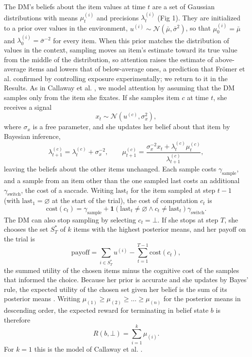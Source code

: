 \documentclass[10pt,letterpaper]{article}
\begin{document}
The DM's beliefs about the item values at time \(t\) are a set of
Gaussian distributions with means \(\mu_t^{(i)}\) and precisions
\(\lambda_t^{(i)}\) (Fig 1). They are initialized to a prior over values
in the environment,
\(u^{(i)} \sim \mathcal{N}(\bar{\mu}, \bar{\sigma}^2)\), so that
\(\mu_0^{(i)} = \bar{\mu}\) and \(\lambda_0^{(i)} = \bar{\sigma}^{-2}\)
for every item. When this prior matches the distribution of values in
the context, sampling moves an item's estimate toward its true value
from the middle of the distribution, so attention raises the estimate of
above-average items and lowers that of below-average ones, a prediction
that Frömer et al. \cite{fromer2025} confirmed by controlling exposure
experimentally; we return to it in the Results. As in Callaway et al.
\cite{callaway2021}, we model attention by assuming that the DM samples
only from the item she fixates. If she samples item \(c\) at time \(t\),
she receives a signal \begin{equation}
x_t \sim \mathcal{N}\!\left(u^{(c)}, \sigma_x^2\right), 
\end{equation} where \(\sigma_x\) is a free parameter, and she updates
her belief about that item by Bayesian inference, \begin{equation}
\lambda_{t+1}^{(c)} = \lambda_t^{(c)} + \sigma_x^{-2}, \qquad \mu_{t+1}^{(c)} = \frac{\sigma_x^{-2} x_t + \lambda_t^{(c)} \mu_t^{(c)}}{\lambda_{t+1}^{(c)}}, 
\end{equation} leaving the beliefs about the other items unchanged. Each
sample costs \(\gamma_{\text{sample}}\), and a sample from an item other
than the one sampled last costs an additional
\(\gamma_{\text{switch}}\), the cost of a saccade. Writing
\(\text{last}_t\) for the item sampled at step \(t - 1\) (with
\(\text{last}_1 = \varnothing\) at the start of the trial), the cost of
computation \(c_t\) is \begin{equation}
\text{cost}(c_t) = \gamma_{\text{sample}} + \mathbf{1}\!\left(\text{last}_t \neq \varnothing \wedge c_t \neq \text{last}_t\right) \gamma_{\text{switch}}. 
\end{equation} The DM can also stop sampling by selecting
\(c_t = \bot\). If she stops at step \(T\), she chooses the set
\(S^*_T\) of \(k\) items with the highest posterior means, and her
payoff on the trial is \begin{equation}
\text{payoff} = \sum_{i \in S^*_T} u^{(i)} - \sum_{t=1}^{T-1} \text{cost}(c_t), 
\end{equation} the summed utility of the chosen items minus the
cognitive cost of the samples that informed the choice. Because her
prior is accurate and she updates by Bayes' rule, the expected utility
of the chosen set given her belief is the sum of its posterior means
\cite{callaway2021,lieder2026}. Writing
\(\mu_{(1)} \ge \mu_{(2)} \ge \dots \ge \mu_{(n)}\) for the posterior
means in descending order, the expected reward for terminating in belief
state \(b\) is therefore \begin{equation}
R(b, \bot) = \sum_{i=1}^{k} \mu_{(i)}. 
\end{equation} For \(k = 1\) this is the model of Callaway et al.
\cite{callaway2021}.
\end{document}
